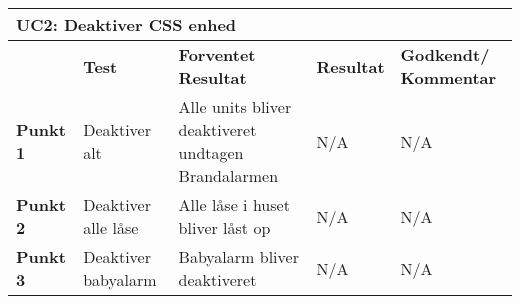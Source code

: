 \begin{table}[htbp] \centering
\begin{tabular}{|p{}|p{}|p{}|p{}|p{}|} %
	\hline
\multicolumn{5}{|l|}{\textbf{UC2: Deaktiver CSS enhed}} \\\hline
&\textbf{Test} &\textbf{Forventet \newline Resultat} &\textbf{Resultat} &\textbf{Godkendt/ \newline Kommentar} \\\hline
\textbf{Punkt 1}	&
Deaktiver alt &
Alle units bliver deaktiveret undtagen Brandalarmen &
N/A &
N/A \\\hline
\textbf{Punkt 2} &
Deaktiver alle låse &
Alle låse i huset bliver låst op &
N/A	&
N/A \\\hline
\textbf{Punkt 3} &
Deaktiver babyalarm &
Babyalarm bliver deaktiveret &
N/A &
N/A \\\hline
	\end{tabular}
	\label{ATUC2} 
\end{table}